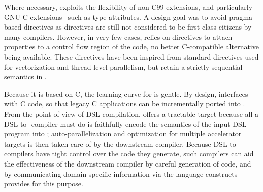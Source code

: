 Where necessary, \pencil exploits the flexibility of non-C99 extensions,
and particularly GNU
C extensions~\cite{gccguide} such as type attributes.
A design goal was to avoid pragma-based directives as directives are still
not considered to be first class citizens by many compilers.
However, in very few cases, \pencil relies on directives to attach
properties to a control flow region of the code, no better C-compatible
alternative being available.
These directives have been inspired from standard directives used
for vectorization and thread-level parallelism, but retain a strictly
sequential semantics in \pencil.

Because it is based on C, the learning curve for \pencil is gentle.
By design, \pencil interfaces with C code, so that legacy C 
applications can be
incrementally ported into \pencil.  From the point of view of DSL
compilation, \pencil offers a tractable target because all a DSL-to-\pencil
compiler must do is faithfully encode the semantics of the input DSL program
into \pencil; auto-parallelization and optimization for multiple accelerator
targets is then taken care of by the downstream \pencil compiler.
Because DSL-to-\pencil compilers have tight control over the code they
generate, such compilers can aid the effectiveness of the downstream
\pencil compiler by careful generation of code, and by communicating
domain-specific information via the language constructs \pencil provides
for this purpose.


